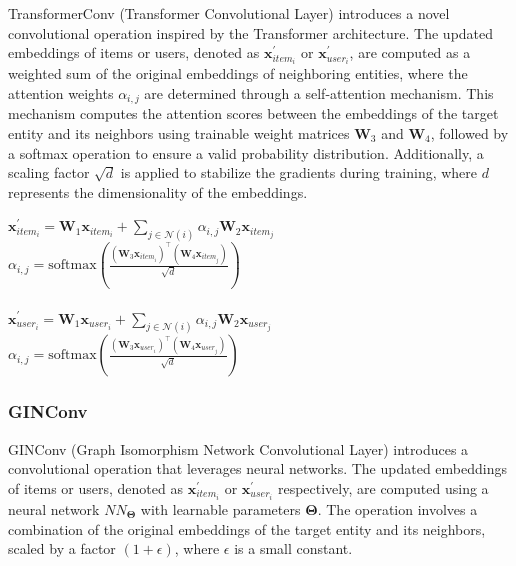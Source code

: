 \documentclass[bst/sn-nature]{sn-jnl}
\begin{document}
\begin{multicols}{2}
\quad TransformerConv (Transformer Convolutional Layer) introduces a novel convolutional operation inspired by the Transformer\cite{transformer} architecture. The updated embeddings of items or users, denoted as $\mathbf{x}^{\prime}_{item_i}$ or $\mathbf{x}^{\prime}_{user_i}$, are computed as a weighted sum of the original embeddings of neighboring entities, where the attention weights $\alpha_{i,j}$ are determined through a self-attention mechanism. This mechanism computes the attention scores between the embeddings of the target entity and its neighbors using trainable weight matrices $\mathbf{W}_3$ and $\mathbf{W}_4$, followed by a softmax operation to ensure a valid probability distribution. Additionally, a scaling factor $\sqrt{d}$ is applied to stabilize the gradients during training, where $d$ represents the dimensionality of the embeddings. \\ 

\begin{center}
    $\mathbf{x}^{\prime}_{item_{i}} = \mathbf{W}_1 \mathbf{x}_{item_{i}} + \sum_{j \in \mathcal{N}(i)} \alpha_{i,j} \mathbf{W}_2 \mathbf{x}_{item_{j}}$ \\
    $\alpha_{i,j} = \textrm{softmax} \left( \frac{(\mathbf{W}_3\mathbf{x}_{item_{i}})^{\top} (\mathbf{W}_4\mathbf{x}_{item_{j}})} {\sqrt{d}} \right)$ \\~\\
    $\mathbf{x}^{\prime}_{user_{i}} = \mathbf{W}_1 \mathbf{x}_{user_{i}} + \sum_{j \in \mathcal{N}(i)} \alpha_{i,j} \mathbf{W}_2 \mathbf{x}_{user_{j}}$ \\
    $\alpha_{i,j} = \textrm{softmax} \left( \frac{(\mathbf{W}_3\mathbf{x}_{user_{i}})^{\top} (\mathbf{W}_4\mathbf{x}_{user_{j}})} {\sqrt{d}} \right)$ 
\end{center}

\subsubsection{GINConv\cite{ginconv}} 

\quad GINConv (Graph Isomorphism Network Convolutional Layer) introduces a convolutional operation that leverages neural networks. The updated embeddings of items or users, denoted as $\mathbf{x}^{\prime}_{item_i}$ or $\mathbf{x}^{\prime}_{user_i}$ respectively, are computed using a neural network $NN_{\mathbf{\Theta}}$ with learnable parameters $\mathbf{\Theta}$. The operation involves a combination of the original embeddings of the target entity and its neighbors, scaled by a factor $(1 + \epsilon)$, where $\epsilon$ is a small constant. \\ 


\end{multicols}
\end{document}
